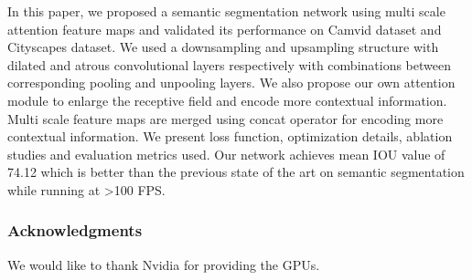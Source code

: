 \documentclass{article}
\begin{document}
In this paper, we proposed a semantic segmentation network using multi scale attention feature maps and validated its performance on Camvid dataset and Cityscapes dataset. We used a downsampling and upsampling structure with dilated and atrous convolutional layers respectively with combinations between corresponding pooling and unpooling layers. We also propose our own attention module to enlarge the receptive field and encode more contextual information. Multi scale feature maps are merged using concat operator for encoding more contextual information. We present loss function, optimization details, ablation studies and evaluation metrics used. Our network achieves mean IOU value of 74.12 which is better than the previous state of the art on semantic segmentation while running at >100 FPS. 

\subsubsection*{Acknowledgments}

We would like to thank Nvidia for providing the GPUs.


\end{document}

